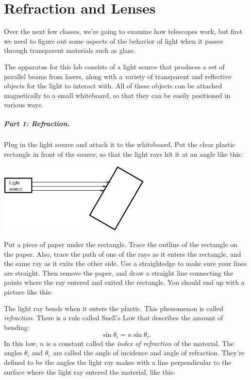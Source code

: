 \chapter{Refraction and Lenses}

Over the next few classes, we're going to examine how telescopes work,
but first we need to figure out some aspects of the behavior of light
when it passes through transparent materials such as glass.

The apparatus for this lab consists of a light source that produces a set
of parallel beams from lasers, along with a variety of transparent and
reflective objects for the light to interact with.  All of these objects
can be attached magnetically to a small whiteboard, so that they can be
easily positioned in various ways.

\paragraph{Part 1: Refraction.}
Plug in the light source and attach it to the whiteboard.  Put
the clear plastic rectangle in front of the source, so that
the light rays hit it at an angle like this:

\centerline{\includegraphics[width=3in]{figs/lensfig1.eps}}


Put a piece of paper under the rectangle.  Trace the outline of the rectangle
on the paper.  Also, trace the path of one of the rays as it enters
the rectangle, and the same ray as it exits the other side.  Use
a straightedge to make sure your lines are straight.
Then remove the paper, and draw a straight line connecting the points
where the ray entered and exited the rectangle. 
You should end up
with a picture like this:

\centerline{\epsfxsize 3in}



The light ray bends when it enters the plastic.  This phenomenon is
called {\it refraction}.  There is a rule called Snell's Law that
describes the amount of bending:
$$
\sin\theta_i=n\sin\theta_r.
$$
In this law, $n$ is a constant called the {\it index of refraction} of 
the material.  The angles $\theta_i$ and $\theta_r$ are called the
angle of incidence and angle of refraction.  They're defined to be the
angles the light ray makes with a line perpendicular to the surface
where the light ray entered the material, like this:

